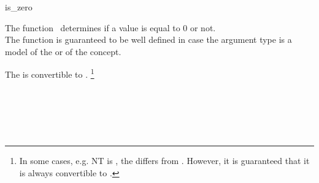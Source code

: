 \begin{ccRefFunction}{is_zero}

\ccDefinition

The function \ccRefName\ determines if a value is equal to 0 or not.\\
The function is guaranteed to be well defined in case the argument type 
is a model of the  or of 
the  concept. 


        { The  is convertible to . 
          \footnote{In some cases, e.g. NT is , the 
           differs from . 
          However, it is guaranteed that it is always convertible to .}
        }

\ccSeeAlso

\\
\\
\\
\\

\end{ccRefFunction}

